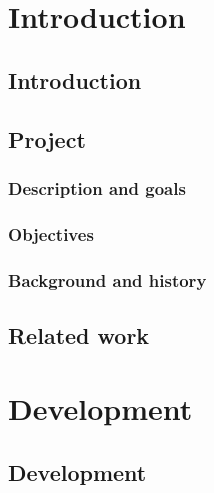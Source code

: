 \documentclass[BSP,english,oneside]{classes/gucthesis}
\begin{document}


\makefrontpages



\tableofcontents
\listoffigures
\listoftables

\part{Introduction}
	
	\chapter{Introduction}
	\label{chap:introduction}
	

	\chapter{Project}
		\label{chap:project}

		\section{Description and goals}
		

		\section{Objectives}
		

		\section{Background and history}
		

	\chapter{Related work}
	\label{chap:related_work}
	

\part{Development}

	\chapter{Development}
		\label{chap:development}
\end{document}
